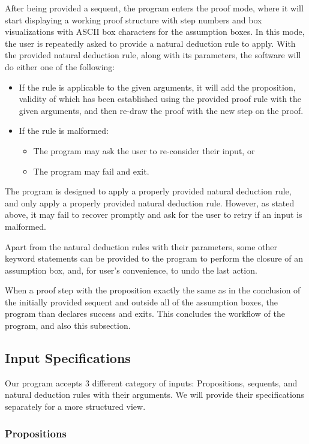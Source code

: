 \documentclass{article}
\begin{document}
After being provided a sequent, the program enters the proof mode,
where it will start displaying a working proof structure with step
numbers and box visualizations with ASCII box characters for the
assumption boxes. In this mode, the user is repeatedly asked to
provide a natural deduction rule to apply. With the provided
natural deduction rule, along with its parameters, the software
will do either one of the following:
\begin{itemize}
	\item If the rule is applicable to the given arguments, it will
		add the proposition, validity of which has been established
		using the provided proof rule with the given arguments, and
		then re-draw the proof with the new step on the proof.
	\item If the rule is malformed:
		\begin{itemize}
			\item The program may ask the user to re-consider their
				input, or
			\item The program may fail and exit.
		\end{itemize}
\end{itemize}

The program is designed to apply a properly provided natural
deduction rule, and only apply a properly provided natural deduction
rule. However, as stated above, it may fail to recover promptly
and ask for the user to retry if an input is malformed.

Apart from the natural deduction rules with their parameters,
some other keyword statements can be provided to the program
to perform the closure of an assumption box, and, for user's
convenience, to undo the last action.

When a proof step with the proposition exactly the same as in the
conclusion of the initially provided sequent and outside all of
the assumption boxes, the program than declares success and
exits. This concludes the workflow of the program, and also this
subsection.

\subsection{Input Specifications}

Our program accepts 3 different category of inputs:
Propositions, sequents, and natural deduction rules
with their arguments. We will provide their specifications
separately for a more structured view.

\subsubsection{Propositions}
\end{document}
